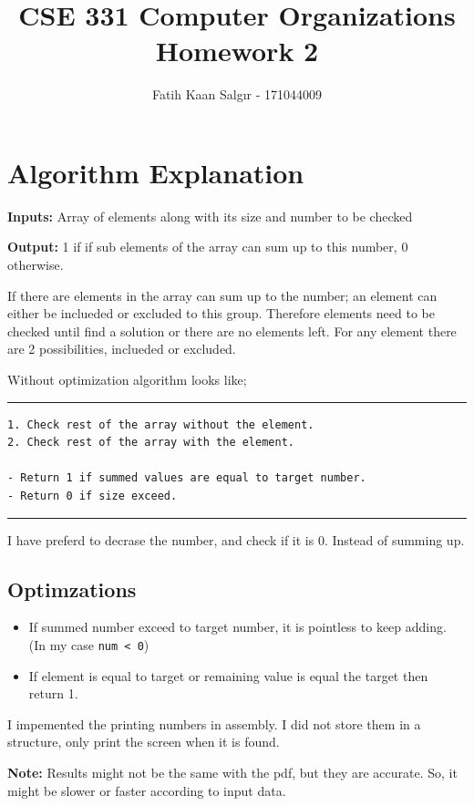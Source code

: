 \documentclass[11pt]{article}
\author{Fatih Kaan Salgır - 171044009}
\date{}
\title{CSE 331 Computer Organizations Homework 2}
\begin{document}
\maketitle


\section{Algorithm Explanation}
\label{sec:orga1306c2}

\textbf{Inputs:} Array of elements along with its size and number to be checked  

\textbf{Output:} 1 if if sub elements of the array can sum up to this number, 0 otherwise.

If there are elements in the array can sum up to the number; an element can either be inclueded or excluded to this group. Therefore elements need to be checked until find a solution or there are no elements left. For any element there are 2 possibilities, inclueded or excluded.

Without optimization algorithm looks like;

\noindent\rule{\textwidth}{0.5pt}
\begin{verbatim}
1. Check rest of the array without the element.
2. Check rest of the array with the element.

- Return 1 if summed values are equal to target number.
- Return 0 if size exceed.
\end{verbatim}

\noindent\rule{\textwidth}{0.5pt}

I have preferd to decrase the number, and check if it is 0. Instead of summing up.


\subsection{Optimzations}
\label{sec:orgf03a81d}
\begin{itemize}
\item If summed number exceed to target number, it is pointless to keep adding. (In my case \texttt{num < 0})
\item If element is equal to target or remaining value is equal the target then return 1.
\end{itemize}


I impemented the printing numbers in assembly. I did not store them in a structure, only print the screen when it is found.

\textbf{Note:} Results might not be the same with the pdf, but they are accurate. So, it might be slower or faster according to input data.
\end{document}
